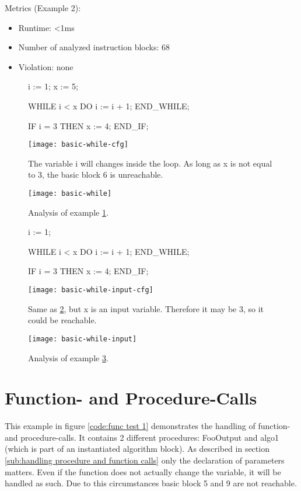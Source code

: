 Metrics (Example 2):
\begin{itemize}
	\item Runtime: <1ms
	\item Number of analyzed instruction blocks: 68
	\item Violation: none
\end{itemize}


\begin{figure}[h!]
	\begin{GenericCode}
		i := 1;
		x := 5;
		
		WHILE i < x DO
			i := i + 1;
		END_WHILE;
		
		IF i = 3 THEN
			x := 4;
		END_IF;		\end{GenericCode}
	\centering
	\texttt{[image: basic-while-cfg]}
	\caption{The variable i will changes inside the loop. As long as x is not equal to 3, the basic block 6 is unreachable. }
	\label{code:loop example 1 cfg}
\end{figure}
\begin{figure}[h!]
	\centering
	\texttt{[image: basic-while]}
	\caption{Analysis of example \ref{code:loop example 1 cfg}. }
	\label{code:loop example 1}
\end{figure}
\begin{figure}[h!]
	\begin{GenericCode}
		i := 1;
		
		WHILE i < x DO
			i := i + 1;
		END_WHILE;
		
		IF i = 3 THEN
			x := 4;
		END_IF;		\end{GenericCode}
	\centering
	\texttt{[image: basic-while-input-cfg]}
	\caption{Same as \ref{code:loop example 1}, but x is an input variable. Therefore it may be 3, so it could be reachable.}
	\label{code:loop example 2 cfg}
\end{figure}
\begin{figure}[h!]
	\centering
	\texttt{[image: basic-while-input]}
	\caption{Analysis of example \ref{code:loop example 2 cfg}.}
	\label{code:loop example 2}
\end{figure}
\section{Function- and Procedure-Calls}
This example in figure \ref{code:func test 1} demonstrates the handling of function- and procedure-calls. It contains 2 different procedures: FooOutput and algo1 (which is part of an instantiated algorithm block). 
As described in section \ref{sub:handling procedure and function calls} only the declaration of parameters matters. Even if the function does not actually change the variable, it will be handled as such. 
Due to this circumstances basic block 5 and 9 are not reachable.


